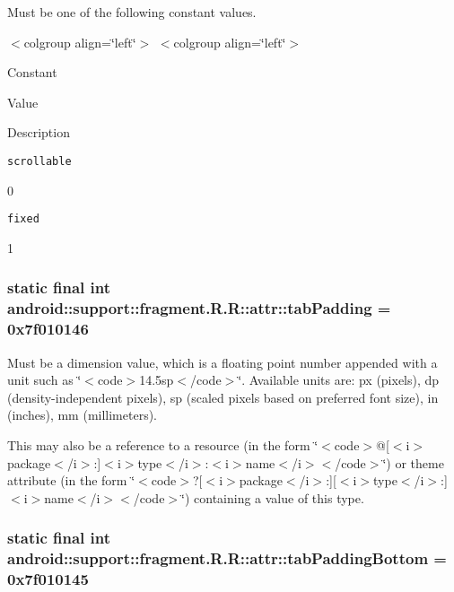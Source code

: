 Must be one of the following constant values. \begin{TabularC}{0}
\hline
\end{TabularC}
$<$colgroup align=\char`\"{}left\char`\"{}$>$ $<$colgroup align=\char`\"{}left\char`\"{}$>$ 

Constant

Value

Description 

{\tt scrollable}

0

{\tt fixed}

1\hypertarget{classandroid_1_1support_1_1fragment_1_1_r_1_1attr_665d4a1f8d01ed4e83b523db5f0ab98f}{
\subsubsection[{tabPadding}]{\setlength{\rightskip}{0pt plus 5cm}static final int android::support::fragment.R.R::attr::tabPadding = 0x7f010146}}
\label{classandroid_1_1support_1_1fragment_1_1_r_1_1attr_665d4a1f8d01ed4e83b523db5f0ab98f}


Must be a dimension value, which is a floating point number appended with a unit such as \char`\"{}$<$code$>$14.5sp$<$/code$>$\char`\"{}. Available units are: px (pixels), dp (density-independent pixels), sp (scaled pixels based on preferred font size), in (inches), mm (millimeters). 

This may also be a reference to a resource (in the form \char`\"{}$<$code$>$@\mbox{[}$<$i$>$package$<$/i$>$:\mbox{]}$<$i$>$type$<$/i$>$:$<$i$>$name$<$/i$>$$<$/code$>$\char`\"{}) or theme attribute (in the form \char`\"{}$<$code$>$?\mbox{[}$<$i$>$package$<$/i$>$:\mbox{]}\mbox{[}$<$i$>$type$<$/i$>$:\mbox{]}$<$i$>$name$<$/i$>$$<$/code$>$\char`\"{}) containing a value of this type. \hypertarget{classandroid_1_1support_1_1fragment_1_1_r_1_1attr_0001d99ece9203f7434d70bd807656db}{
\subsubsection[{tabPaddingBottom}]{\setlength{\rightskip}{0pt plus 5cm}static final int android::support::fragment.R.R::attr::tabPaddingBottom = 0x7f010145}}
\label{classandroid_1_1support_1_1fragment_1_1_r_1_1attr_0001d99ece9203f7434d70bd807656db}


